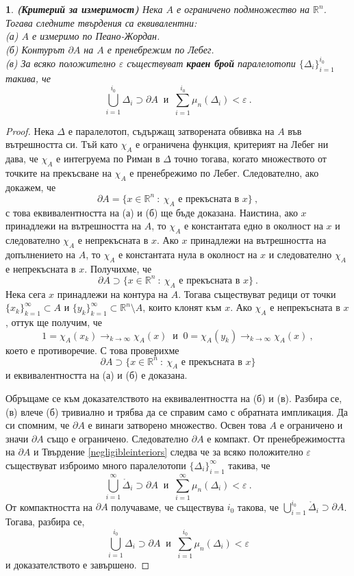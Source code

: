 \documentclass[11pt]{article}
\numberwithin{equation}{section}
\numberwithin{figure}{section}
\numberwithin{table}{section}
\theoremstyle{plain}
\theoremstyle{definition}
\theoremstyle{remark}
\theoremstyle{definition}
\theoremstyle{remark}
\theoremstyle{plain}
\theoremstyle{definition}
\theoremstyle{definition}
\theoremstyle{plain}
\theoremstyle{plain}
\newtheorem{prop}[thm]{\protect\propositionname}
\theoremstyle{plain}
\theoremstyle{definition}
\theoremstyle{plain}
\providecommand{\propositionname}{Твърдение}
\newcommand*{\R}{\mathbb{R}}
\begin{document}
\begin{prop}\label{measurability_criterion}
\textbf{(Критерий за измеримост)}
Нека $A$ е ограничено подмножество на $\R^n$. Тогава следните твърдения са еквивалентни:
\\(а) $A$ е измеримо по Пеано-Жордан.
\\(б) Контурът $\partial A$ на $A$ е пренебрежим по Лебег.
\\(в) За всяко положително $\varepsilon$ съществуват \textbf{краен брой} паралелотопи $\{\Delta_i \}_{i=1}^{i_0}$ такива, че $$\bigcup_{i=1}^{i_0} \Delta_i \supset \partial A \ \mbox{ и } \ \sum_{i=1}^{i_0} \mu_n(\Delta_i)<\varepsilon \ .$$
\end{prop}

\begin{proof}
Нека $\Delta$ е паралелотоп, съдържащ затворената обвивка на $A$ във вътрешността си. Тъй като $\chi_A$ е ограничена функция, критерият на Лебег ни дава, че $\chi_A$ е интегруема по Риман в $\Delta$ точно тогава, когато множеството от точките на прекъсване на $\chi_A$ е пренебрежимо по Лебег. Следователно, ако докажем, че
$$\partial A = \{ x\in \R^n \ : \ \chi_A \mbox{ е прекъсната в } x\} \ ,$$
с това еквивалентността на (а) и (б) ще бъде доказана. Наистина, ако $x$ принадлежи на вътрешността на $A$, то $\chi_A$ е константата едно в околност на $x$ и следователно $\chi_A$ е непрекъсната в $x$. Ако $x$ принадлежи на вътрешността на допълнението на $A$, то $\chi_A$ е константата нула в околност на $x$ и следователно $\chi_A$ е непрекъсната в $x$. Получихме, че
$$\partial A \supset \{ x\in \R^n \ : \ \chi_A \mbox{ е прекъсната в } x\} \ .$$
Нека сега $x$ принадлежи на контура на $A$. Тогава съществуват редици от точки $\{ x_k\}_{k=1}^\infty \subset A$ и $\{ y_k\}_{k=1}^\infty \subset \R^n\setminus A$, които клонят към $x$. Ако $\chi_A$ е непрекъсната в $x$, оттук ще получим, че
$$1=\chi_A (x_k)\longrightarrow_{k\to \infty} \chi_A (x)  \ \mbox{ и } \  0=\chi_A (y_k)\longrightarrow_{k\to \infty} \chi_A (x) \ ,$$
което е противоречие. С това проверихме
$$\partial A \supset \{ x\in \R^n \ : \ \chi_A \mbox{ е прекъсната в } x\}$$
и еквивалентността на (а) и (б) е доказана.

Обръщаме се към доказателството на еквивалентността на (б) и (в). Разбира се, (в) влече (б) тривиално и трябва да се справим само с обратната импликация. Да си спомним, че $\partial A$ е винаги затворено множество. Освен това $A$ е ограничено и значи $\partial A$ също е ограничено. Следователно $\partial A$ е компакт. От пренебрежимостта на $\partial A$ и Твърдение \ref{negligibleinteriors} следва че за всяко положително $\varepsilon$ съществуват изброимо много паралелотопи $\{\Delta_i \}_{i=1}^\infty$ такива, че
$$\bigcup_{i=1}^\infty \mathring\Delta_i \supset \partial A  \ \mbox{ и } \ \sum_{i=1}^\infty \mu_n(\Delta_i)<\varepsilon \ .$$
От компактността на $\partial A$ получаваме, че съществува $i_0$ такова, че $\bigcup_{i=1}^{i_0} \mathring\Delta_i \supset \partial A$. Тогава, разбира се,
$$\bigcup_{i=1}^{i_0} \Delta_i \supset \partial A  \ \mbox{ и } \ \sum_{i=1}^{i_0} \mu_n(\Delta_i)<\varepsilon$$
и доказателството е завършено.
\end{proof}
\end{document}
